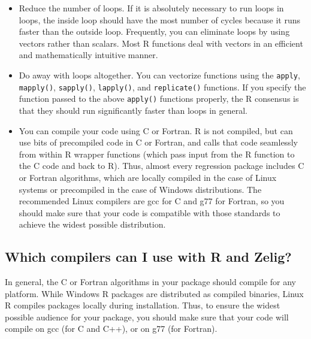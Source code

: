 \begin{itemize}

\item Reduce the number of loops.  If it is absolutely necessary to run 
loops in loops, the inside loop should have the most number of cycles
because it runs faster than the outside loop.  Frequently, you can
eliminate loops by using vectors rather than scalars. Most R functions
deal with vectors in an efficient and mathematically intuitive manner.

\item Do away with loops altogether.  You can vectorize functions 
using the {\tt apply}, {\tt mapply()}, {\tt sapply()}, {\tt lapply()},
and {\tt replicate()} functions.  If you specify the function passed
to the above {\tt *apply()} functions properly, the R consensus is that
they should run significantly faster than loops in general.

\item You can compile your code using C or Fortran.  R is not compiled, 
but can use bits of precompiled code in C or Fortran, and
calls that code seamlessly from within R wrapper functions (which pass
input from the R function to the C code and back to R).  Thus, almost
every regression package includes C or Fortran algorithms, which are
locally compiled in the case of Linux systems or precompiled in the
case of Windows distributions.  The recommended Linux compilers are
gcc for C and g77 for Fortran, so you should make sure that your code
is compatible with those standards to achieve the widest possible
distribution.

\end{itemize}

\subsection*{Which compilers can I use with R and Zelig?}

In general, the C or Fortran algorithms in your package should compile
for any platform.  While Windows R packages are distributed as
compiled binaries, Linux R compiles packages locally during
installation.  Thus, to ensure the widest possible audience for your
package, you should make sure that your code will compile on gcc (for
C and C++), or on g77 (for Fortran).  

